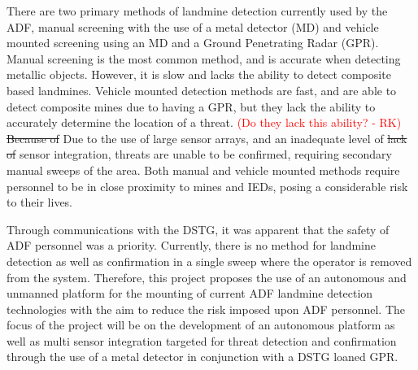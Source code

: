\documentclass[main.tex]{subfiles}
\begin{document}
There are two primary methods of landmine detection currently used by the ADF, manual screening with the use of a metal detector (MD) and vehicle mounted screening using an MD and a Ground Penetrating Radar (GPR). Manual screening is the most common method, and is accurate when detecting metallic objects. However, it is slow and lacks the ability to detect composite based landmines. Vehicle mounted detection methods are fast, and are able to detect composite mines due to having a GPR, but they lack the ability to accurately determine the location of a threat. 
\textcolor{red}{(Do they lack this ability? - RK)}
\sout{Because of} Due to the use of large sensor arrays, and an inadequate level of \sout{lack of} sensor integration, threats are unable to be confirmed, requiring secondary manual sweeps of the area. Both manual and vehicle mounted methods require personnel to be in close proximity to mines and IEDs, posing a considerable risk to their lives. %
\\
%
%

Through communications with the DSTG, it was apparent that the safety of ADF personnel  was a priority. Currently, there is no method for landmine detection as well as confirmation in a single sweep where the operator is removed from the system. Therefore, this project proposes the use of an autonomous and unmanned platform for the mounting of current ADF landmine detection technologies with the aim to reduce the risk imposed upon ADF personnel. The focus of the project will be on the development of an autonomous platform as well as multi sensor integration targeted for threat detection and confirmation through the use of a metal detector in conjunction with a DSTG loaned GPR.
\\

\end{document}
